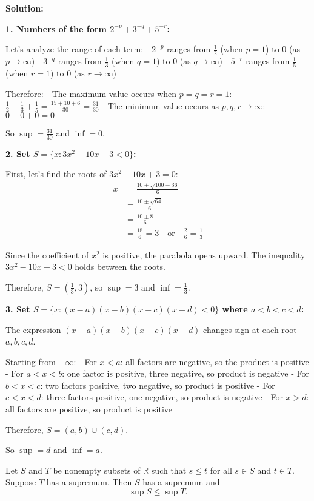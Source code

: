 \textbf{Solution:}

\textbf{1. Numbers of the form $2^{-p} + 3^{-q} + 5^{-r}$:}

Let's analyze the range of each term:
- $2^{-p}$ ranges from $\frac{1}{2}$ (when $p = 1$) to $0$ (as $p \to \infty$)
- $3^{-q}$ ranges from $\frac{1}{3}$ (when $q = 1$) to $0$ (as $q \to \infty$)
- $5^{-r}$ ranges from $\frac{1}{5}$ (when $r = 1$) to $0$ (as $r \to \infty$)

Therefore:
- The maximum value occurs when $p = q = r = 1$: $\frac{1}{2} + \frac{1}{3} + \frac{1}{5} = \frac{15 + 10 + 6}{30} = \frac{31}{30}$
- The minimum value occurs as $p, q, r \to \infty$: $0 + 0 + 0 = 0$

So $\sup = \textbf{$\frac{31}{30}$}$ and $\inf = \textbf{$0$}$.

\textbf{2. Set $S = \{x : 3x^2 - 10x + 3 < 0\}$:}

First, let's find the roots of $3x^2 - 10x + 3 = 0$:
\begin{align*}
x &= \frac{10 \pm \sqrt{100 - 36}}{6} \\
&= \frac{10 \pm \sqrt{64}}{6} \\
&= \frac{10 \pm 8}{6} \\
&= \frac{18}{6} = 3 \quad \text{or} \quad \frac{2}{6} = \frac{1}{3}
\end{align*}

Since the coefficient of $x^2$ is positive, the parabola opens upward. The inequality $3x^2 - 10x + 3 < 0$ holds between the roots.

Therefore, $S = (\frac{1}{3}, 3)$, so $\sup = \textbf{$3$}$ and $\inf = \textbf{$\frac{1}{3}$}$.

\textbf{3. Set $S = \{x : (x - a)(x - b)(x - c)(x - d) < 0\}$ where $a < b < c < d$:}

The expression $(x - a)(x - b)(x - c)(x - d)$ changes sign at each root $a, b, c, d$.

Starting from $-\infty$:
- For $x < a$: all factors are negative, so the product is positive
- For $a < x < b$: one factor is positive, three negative, so product is negative
- For $b < x < c$: two factors positive, two negative, so product is positive
- For $c < x < d$: three factors positive, one negative, so product is negative
- For $x > d$: all factors are positive, so product is positive

Therefore, $S = (a, b) \cup (c, d)$.

So $\sup = \textbf{$d$}$ and $\inf = \textbf{$a$}$.

\begin{problembox}
Let \( S \) and \( T \) be nonempty subsets of \( \mathbb{R} \) such that \( s \leq t \) for all \( s \in S \) and \( t \in T \). Suppose \( T \) has a supremum. Then \( S \) has a supremum and
\[
\sup S \leq \sup T.
\]
\end{problembox}

